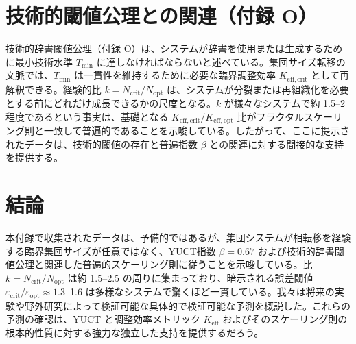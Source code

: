 \documentclass[12pt]{article}
\theoremstyle{remark}
\newcommand{\Keff}{K_{\mathrm{eff}}}
\newcommand{\Tmin}{T_{\min}}
\begin{document}
	\section{技術的閾値公理との関連（付録 O）}
	\label{sec:connection}
	
	技術的辞書閾値公理（付録 O）は、システムが辞書を使用または生成するために最小技術水準 \(\Tmin\) に達しなければならないと述べている。集団サイズ転移の文脈では、\(\Tmin\) は一貫性を維持するために必要な臨界調整効率 \(K_{\mathrm{eff},\text{crit}}\) として再解釈できる。経験的比 \(k = N_{\text{crit}}/N_{\text{opt}}\) は、システムが分裂または再組織化を必要とする前にどれだけ成長できるかの尺度となる。\(k\) が様々なシステムで約 1.5–2 程度であるという事実は、基礎となる \(K_{\mathrm{eff},\text{crit}}/K_{\mathrm{eff},\text{opt}}\) 比がフラクタルスケーリング則と一致して普遍的であることを示唆している。したがって、ここに提示されたデータは、技術的閾値の存在と普遍指数 \(\beta\) との関連に対する間接的な支持を提供する。
	
	\section{結論}
	\label{sec:conclusion}
	
	本付録で収集されたデータは、予備的ではあるが、集団システムが相転移を経験する臨界集団サイズが任意ではなく、YUCT指数 \(\beta = 0.67\) および技術的辞書閾値公理と関連した普遍的スケーリング則に従うことを示唆している。比 \(k = N_{\text{crit}}/N_{\text{opt}}\) は約 1.5–2.5 の周りに集まっており、暗示される誤差閾値 \(\varepsilon_{\text{crit}}/\varepsilon_{\text{opt}} \approx 1.3\)–1.6 は多様なシステムで驚くほど一貫している。我々は将来の実験や野外研究によって検証可能な具体的で検証可能な予測を概説した。これらの予測の確認は、YUCT と調整効率メトリック \(\Keff\) およびそのスケーリング則の根本的性質に対する強力な独立した支持を提供するだろう。
	
\end{document}
